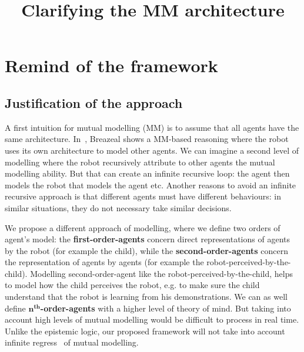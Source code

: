 \documentclass[conference]{IEEEtran}
\begin{document}
\title{Clarifying the MM architecture}


\author{

}



\maketitle

\IEEEpeerreviewmaketitle



\section{Remind of the framework}
\subsection{Justification of the approach}

A first intuition for mutual modelling (MM) is to assume that all agents have the same architecture. In~\cite{breazeal2006using}, Breazeal shows a MM-based reasoning where the robot uses its own architecture to model other agents. We can imagine a second level of modelling where the robot recursively attribute to other agents the mutual modelling ability. But that can create an infinite recursive loop: the agent then models the robot that models the agent etc. Another reasons to avoid an infinite recursive approach is that different agents must have different behaviours: in similar situations, they do not necessary take similar decisions. 

We propose a different approach of modelling, where we define two orders of agent's model: the \textbf{first-order-agents} concern direct representations of agents by the robot (for example the child), while the \textbf{second-order-agents} concern the representation of agents by agents (for example the robot-perceived-by-the-child). 
Modelling second-order-agent like the robot-perceived-by-the-child, helps to model how the child perceives the robot, e.g. to make sure the child understand that the robot is learning from his demonstrations. 
We can as well define $\textbf{n}^{\textbf{th}}$\textbf{-order-agents} with a higher level of theory of mind. But taking into account high levels of mutual modelling would be difficult to process in real time. Unlike the epistemic logic, our proposed framework will not take into account infinite regress~\cite{clark1991grounding} of mutual modelling.
\end{document}
